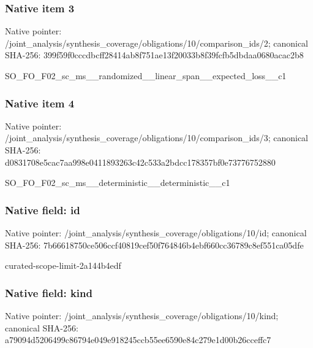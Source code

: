 \documentclass[10pt,a4paper]{article}
\begin{document}
\subsubsection{Native item 3}
Native pointer: /joint\_\allowbreak{}analysis/synthesis\_\allowbreak{}coverage/obligations/10/comparison\_\allowbreak{}ids/2; canonical SHA-256: 399f59f0cccdbcff28414ab8f751ae13f20033b8f39fcfb5dbdaa0680acac2b8

\begingroup\raggedright\sloppy SO\_\allowbreak{}FO\_\allowbreak{}F02\_\allowbreak{}sc\_\allowbreak{}ms\_\allowbreak{}\_\allowbreak{}randomized\_\allowbreak{}\_\allowbreak{}linear\_\allowbreak{}span\_\allowbreak{}\_\allowbreak{}expected\_\allowbreak{}loss\_\allowbreak{}\_\allowbreak{}c1\par\endgroup

\subsubsection{Native item 4}
Native pointer: /joint\_\allowbreak{}analysis/synthesis\_\allowbreak{}coverage/obligations/10/comparison\_\allowbreak{}ids/3; canonical SHA-256: d0831708e5cac7aa998e0411893263c42c533a2bdcc178357bf0e73776752880

\begingroup\raggedright\sloppy SO\_\allowbreak{}FO\_\allowbreak{}F02\_\allowbreak{}sc\_\allowbreak{}ms\_\allowbreak{}\_\allowbreak{}deterministic\_\allowbreak{}\_\allowbreak{}deterministic\_\allowbreak{}\_\allowbreak{}c1\par\endgroup

\subsubsection{Native field: id}
Native pointer: /joint\_\allowbreak{}analysis/synthesis\_\allowbreak{}coverage/obligations/10/id; canonical SHA-256: 7b66618750ce506ccf40819cef50f764846b4ebf660cc36789c8ef551ca05dfe

\begingroup\raggedright\sloppy curated-scope-limit-2a144b4edf\par\endgroup

\subsubsection{Native field: kind}
Native pointer: /joint\_\allowbreak{}analysis/synthesis\_\allowbreak{}coverage/obligations/10/kind; canonical SHA-256: a79094d5206499c86794e049e918245ccb55ee6590e84c279e1d00b26cceffc7
\end{document}
